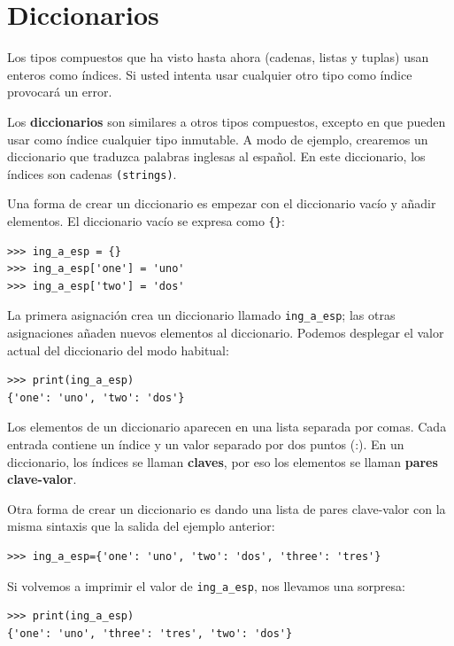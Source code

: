 
\chapter{Diccionarios}

  
  

Los tipos compuestos que ha visto hasta ahora (cadenas, listas y tuplas)
usan enteros como índices. Si usted intenta usar cualquier otro tipo
como índice provocará un error.

Los \textbf{diccionarios} son similares a otros tipos compuestos,
excepto en que pueden usar como índice cualquier tipo inmutable. A
modo de ejemplo, crearemos un diccionario que traduzca palabras inglesas
al español. En este diccionario, los índices son cadenas \texttt{(strings)}.

Una forma de crear un diccionario es empezar con el diccionario vacío
y añadir elementos. El diccionario vacío se expresa como \texttt{\{\}}:
\begin{verbatim}
>>> ing_a_esp = {}
>>> ing_a_esp['one'] = 'uno'
>>> ing_a_esp['two'] = 'dos'
\end{verbatim}

La primera asignación crea un diccionario llamado \texttt{ing\_a\_esp};
las otras asignaciones añaden nuevos elementos al diccionario. Podemos
desplegar el valor actual del diccionario del modo habitual:
\begin{verbatim}
>>> print(ing_a_esp)
{'one': 'uno', 'two': 'dos'}
\end{verbatim}

Los elementos de un diccionario aparecen en una lista separada por
comas. Cada entrada contiene un índice y un valor separado por dos
puntos (:). En un diccionario, los índices se llaman \textbf{claves},
por eso los elementos se llaman \textbf{pares clave-valor}.

Otra forma de crear un diccionario es dando una lista de pares clave-valor
con la misma sintaxis que la salida del ejemplo anterior:
\begin{verbatim}
>>> ing_a_esp={'one': 'uno', 'two': 'dos', 'three': 'tres'}
\end{verbatim}

Si volvemos a imprimir el valor de \texttt{ing\_a\_esp}, nos llevamos
una sorpresa:
\begin{verbatim}
>>> print(ing_a_esp)
{'one': 'uno', 'three': 'tres', 'two': 'dos'}
\end{verbatim}

